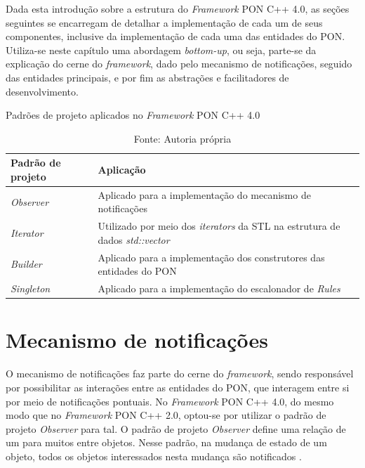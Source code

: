 Dada esta introdução sobre a estrutura do \textit{Framework} PON C++ 4.0, as
seções seguintes se encarregam de detalhar a implementação de cada um de seus
componentes, inclusive da implementação de cada uma das entidades do PON.
Utiliza-se neste capítulo uma abordagem \textit{bottom-up}, ou seja, parte-se da
explicação do cerne do \textit{framework}, dado pelo mecanismo de notificações,
seguido das entidades principais, e por fim as abstrações e facilitadores de
desenvolvimento.

\begin{table}[!htb]
    \centering
    \caption{Padrões de projeto aplicados no \textit{Framework} PON C++ 4.0}
    \caption*{Fonte: Autoria própria}
    \label{tab:padroes}
    \smallskip
    \begin{tabularx}{\textwidth}{|l|X|}\hline
        Padrão de projeto & Aplicação   \\\hline\hline
        \textit{Observer} & Aplicado para a implementação do mecanismo de notificações \\ \hline%
        \textit{Iterator} & Utilizado por meio dos \textit{iterators} da STL na estrutura de dados \textit{std::vector} \\ \hline
        \textit{Builder} & Aplicado para a implementação dos construtores das entidades do PON \\ \hline%
        \textit{Singleton} & Aplicado para a implementação do escalonador de
        \textit{Rules} \\ \hline%
    \end{tabularx}
    \end{table}

\section{Mecanismo de notificações}\label{sec:observer}

O mecanismo de notificações faz parte do cerne do \textit{framework}, sendo
responsável por possibilitar as interações entre as entidades do PON, que
interagem entre si por meio de notificações pontuais. No \textit{Framework} PON
C++ 4.0, do mesmo modo que no \textit{Framework} PON C++ 2.0, optou-se por
utilizar o padrão de projeto \textit{Observer} para tal. O padrão de projeto
\textit{Observer} define uma relação de um para muitos entre objetos. Nesse
padrão, na mudança de estado de um objeto, todos os objetos interessados nesta
mudança são notificados \cite{gamma_1995,msc_Ronszcka_2012}.

